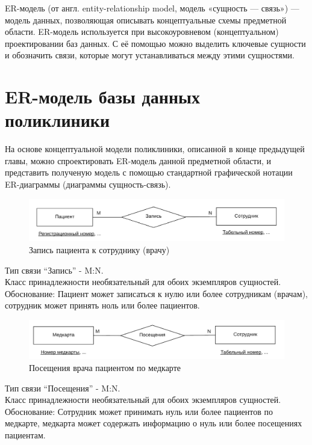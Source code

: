 \documentclass[14pt,a4paper,russian]{extreport}
\begin{document}
ER-модель (от англ. entity-relationship model, модель «сущность — связь») — модель данных,
позволяющая описывать концептуальные схемы предметной области.  ER-модель используется при
высокоуровневом (концептуальном) проектировании баз данных. С её помощью можно выделить ключевые
сущности и обозначить связи, которые могут устанавливаться между этими сущностями.\cite{dbdesign}


\vspace{0.7cm}
\section{ER-модель базы данных поликлиники}
На основе концептуальной модели поликлиники, описанной в конце предыдущей главы, можно
спроектировать ER-модель данной предметной области, и представить полученую модель с
помощью стандартной графической нотации ER-диаграммы (диаграммы сущность-связь).

\cleardoublepage
\begin{figure}[h!]
        \includegraphics[width=\textwidth]{patappemp}
        \caption{Запись пациента к сотруднику (врачу)}
        \label{fig:patappemp}
\end{figure}

\noindent Тип связи ``Запись'' - M:N.\\
Класс принадлежности необязательный для обоих экземпляров сущностей.
Обоснование: Пациент может записаться к нулю или более сотрудникам (врачам), сотрудник может принять ноль или более
пациентов. 

\begin{figure}[h!]
        \includegraphics[width=\textwidth]{medcvisemp}
        \caption{Посещения врача пациентом по медкарте}
        \label{fig:medcvisemp}
\end{figure}

\noindent Тип связи ``Посещения'' - M:N.\\
Класс принадлежности необязательный для обоих экземпляров сущностей.
Обоснование: Сотрудник может принимать нуль или более пациентов по медкарте, медкарта может
содержать информацию о нуль или более посещениях пациентам.
\end{document}
